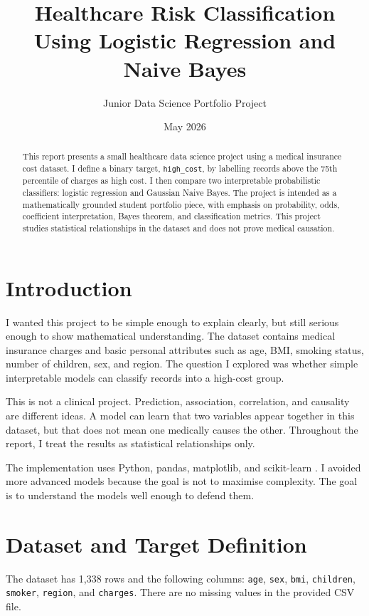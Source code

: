\documentclass[11pt]{article}
\title{Healthcare Risk Classification Using Logistic Regression and Naive Bayes}
\author{Junior Data Science Portfolio Project}
\date{May 2026}
\begin{document}
\maketitle

\begin{abstract}
This report presents a small healthcare data science project using a medical insurance cost dataset. I define a binary target, \texttt{high\_cost}, by labelling records above the 75th percentile of charges as high cost. I then compare two interpretable probabilistic classifiers: logistic regression and Gaussian Naive Bayes. The project is intended as a mathematically grounded student portfolio piece, with emphasis on probability, odds, coefficient interpretation, Bayes theorem, and classification metrics. This project studies statistical relationships in the dataset and does not prove medical causation.
\end{abstract}

\section{Introduction}

I wanted this project to be simple enough to explain clearly, but still serious enough to show mathematical understanding. The dataset contains medical insurance charges and basic personal attributes such as age, BMI, smoking status, number of children, sex, and region. The question I explored was whether simple interpretable models can classify records into a high-cost group.

This is not a clinical project. Prediction, association, correlation, and causality are different ideas. A model can learn that two variables appear together in this dataset, but that does not mean one medically causes the other. Throughout the report, I treat the results as statistical relationships only.

The implementation uses Python, pandas, matplotlib, and scikit-learn \cite{mckinney2010,pedregosa2011,hunter2007}. I avoided more advanced models because the goal is not to maximise complexity. The goal is to understand the models well enough to defend them.

\section{Dataset and Target Definition}

The dataset has 1,338 rows and the following columns: \texttt{age}, \texttt{sex}, \texttt{bmi}, \texttt{children}, \texttt{smoker}, \texttt{region}, and \texttt{charges}. There are no missing values in the provided CSV file.
\end{document}

